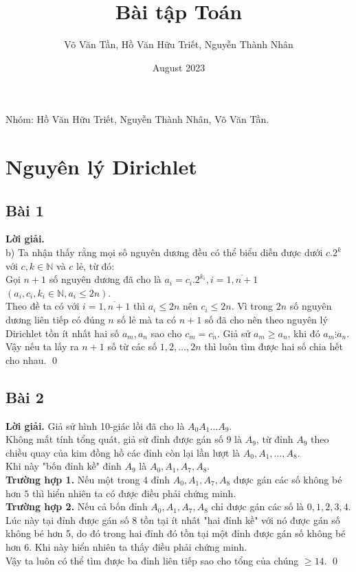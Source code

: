 \documentclass[a4paper,14pt]{article}
\title{Bài tập Toán}
\author{Võ Văn Tần, Hồ Văn Hữu Triết, Nguyễn Thành Nhân}
\date{August 2023}
\begin{document}
Nhóm: Hồ Văn Hữu Triết, Nguyễn Thành Nhân, Võ Văn Tần.
\section{Nguyên lý Dirichlet}
    \subsection{Bài 1}
        \textbf{Lời giải.}
            \\
            b) Ta nhận thấy rằng mọi số nguyên dương đều có thể biểu diễn được dưới $c.2^k$ với $c,k\in\mathbb{N}$ và $c$ lẻ, từ đó: \\
            Gọi $n+1$ số nguyên dương đã cho là $a_i=c_i.2^{k_i}, i=\overline{1,n+1}$ $(a_i,c_i,k_i\in\mathbb{N}, a_i\leqslant 2n)$. \\
            Theo đề ta có với $i=\overline{1,n+1}$ thì $a_i\leqslant 2n$ nên $c_i\leqslant 2n$. Vì trong $2n$ số nguyên dương liên tiếp có đúng $n$ số lẻ mà ta có $n+1$ số đã cho nên theo nguyên lý Dirichlet tồn ít nhất hai số $a_m, a_n$ sao cho $c_m=c_n$. Giả sử $a_m\geqslant a_n$, khi đó $a_m\vdots a_n$. \\
            Vậy nếu ta lấy ra $n+1$ số từ các số $1,2,\ldots,2n$ thì luôn tìm được hai số chia hết cho nhau.
            \qed
    \subsection{Bài 2}
        \textbf{Lời giải.}
            Giả sử hình 10-giác lồi đã cho là $A_0A_1\ldots A_9$. \\
            Không mất tính tổng quát, giả sử đỉnh được gán số $9$ là $A_9$, từ đỉnh $A_9$ theo chiều quay của kim đồng hồ các đỉnh còn lại lần lượt là $A_0,A_1,\ldots,A_8$. \\
            Khi này "bốn đỉnh kề" đỉnh $A_9$ là $A_0,A_1,A_7,A_8$. \\
            \textbf{Trường hợp 1.} Nếu một trong $4$ đỉnh $A_0,A_1,A_7,A_8$ được gán các số không bé hơn $5$ thì hiển nhiên ta có được điều phải chứng minh. \\
            \textbf{Trường hợp 2.} Nếu cả bốn đỉnh $A_0,A_1,A_7,A_8$ chỉ được gán các số là $0,1,2,3,4$. Lúc này tại đỉnh được gán số 8 tồn tại ít nhât "hai đỉnh kề" với nó được gán số không bé hơn 5, do đó trong hai đỉnh đó tồn tại một đỉnh được gán số không bé hơn 6. Khi này hiển nhiên ta thấy điều phải chứng minh. \\
            Vậy ta luôn có thể tìm được ba đỉnh liên tiếp sao cho tổng của chúng $\geqslant14$.
        \qed
\end{document}

